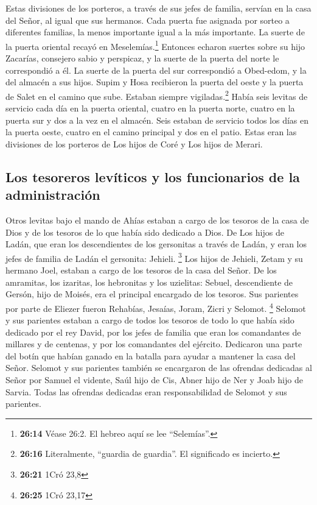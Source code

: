  Estas divisiones de los porteros, a través de sus jefes
de familia, servían en la casa del Señor, al igual que sus hermanos.
 Cada puerta fue asignada por sorteo a diferentes
familias, la menos importante igual a la más importante. 
La suerte de la puerta oriental recayó en Meselemías.\footnote{\textbf{26:14}
  Véase 26:2. El hebreo aquí se lee ``Selemías''.} Entonces echaron
suertes sobre su hijo Zacarías, consejero sabio y perspicaz, y la suerte
de la puerta del norte le correspondió a él.  La suerte
de la puerta del sur correspondió a Obed-edom, y la del almacén a sus
hijos.  Supim y Hosa recibieron la puerta del oeste y la
puerta de Salet en el camino que sube. Estaban siempre
vigiladas.\footnote{\textbf{26:16} Literalmente, ``guardia de guardia''.
  El significado es incierto.}  Había seis levitas de
servicio cada día en la puerta oriental, cuatro en la puerta norte,
cuatro en la puerta sur y dos a la vez en el almacén. 
Seis estaban de servicio todos los días en la puerta oeste, cuatro en el
camino principal y dos en el patio.  Estas eran las
divisiones de los porteros de Los hijos de Coré y Los hijos de Merari.

\hypertarget{los-tesoreros-levuxedticos-y-los-funcionarios-de-la-administraciuxf3n}{%
\subsection{Los tesoreros levíticos y los funcionarios de la
administración}\label{los-tesoreros-levuxedticos-y-los-funcionarios-de-la-administraciuxf3n}}

 Otros levitas bajo el mando de Ahías estaban a cargo de
los tesoros de la casa de Dios y de los tesoros de lo que había sido
dedicado a Dios.  De Los hijos de Ladán, que eran los
descendientes de los gersonitas a través de Ladán, y eran los jefes de
familia de Ladán el gersonita: Jehieli. \footnote{\textbf{26:21} 1Cró
  23,8}  Los hijos de Jehieli, Zetam y su hermano Joel,
estaban a cargo de los tesoros de la casa del Señor.  De
los amramitas, los izaritas, los hebronitas y los uzielitas:
 Sebuel, descendiente de Gersón, hijo de Moisés, era el
principal encargado de los tesoros.  Sus parientes por
parte de Eliezer fueron Rehabías, Jesaías, Joram, Zicri y Selomot.
\footnote{\textbf{26:25} 1Cró 23,17}  Selomot y sus
parientes estaban a cargo de todos los tesoros de todo lo que había sido
dedicado por el rey David, por los jefes de familia que eran los
comandantes de millares y de centenas, y por los comandantes del
ejército.  Dedicaron una parte del botín que habían
ganado en la batalla para ayudar a mantener la casa del Señor.
 Selomot y sus parientes también se encargaron de las
ofrendas dedicadas al Señor por Samuel el vidente, Saúl hijo de Cis,
Abner hijo de Ner y Joab hijo de Sarvia. Todas las ofrendas dedicadas
eran responsabilidad de Selomot y sus parientes.

